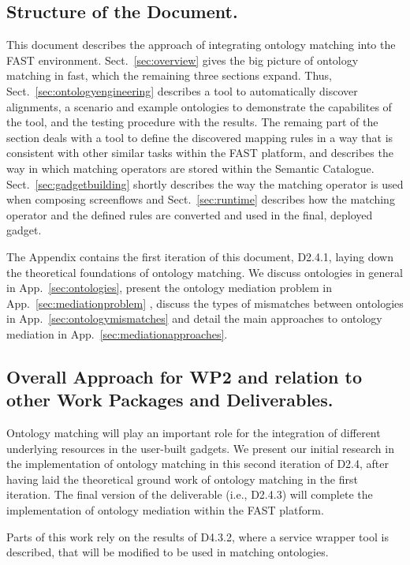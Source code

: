 \documentclass{fast_latex}
\begin{document}
\subsection{Structure of the Document.}
This document describes the approach of integrating ontology matching into the FAST environment. Sect.~\ref{sec:overview} gives the big picture of ontology matching in fast, which the remaining three sections expand. Thus, Sect.~\ref{sec:ontologyengineering} describes a tool to automatically discover alignments, a scenario and example ontologies to demonstrate the capabilites of the tool, and the testing procedure with the results. The remaing part of the section deals with a tool to define the discovered mapping rules in a way that is consistent with other similar tasks within the FAST platform, and describes the way in which matching operators are stored within the Semantic Catalogue. Sect.~\ref{sec:gadgetbuilding} shortly describes the way the matching operator is used when composing screenflows and Sect.~\ref{sec:runtime} describes how the matching operator and the defined rules are converted and used in the final, deployed gadget.

The Appendix contains the first iteration of this document, D2.4.1, laying down the theoretical foundations of ontology matching. We discuss ontologies in general in App.~\ref{sec:ontologies}, present the ontology mediation problem in App.~\ref{sec:mediationproblem} , discuss the types  of mismatches between ontologies in App.~\ref{sec:ontologymismatches} and detail the main approaches to ontology mediation in App.~\ref{sec:mediationapproaches}.

\subsection{Overall Approach for WP2 and relation to other Work Packages and Deliverables.}
Ontology matching will play an important role for the integration of different underlying resources in the user-built gadgets. 
We present our initial research in the implementation of ontology matching in this second iteration of D2.4, after having laid the theoretical ground work of ontology matching in the first iteration. The final version of the deliverable (i.e., D2.4.3) will complete the implementation of ontology mediation within the FAST platform. 

Parts of this work rely on the results of D4.3.2, where a service wrapper tool is described, that will be modified to be used in matching ontologies.
\end{document}
